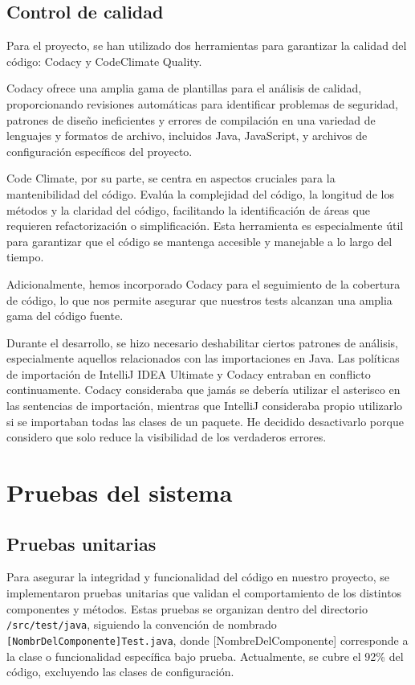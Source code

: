 \subsection{Control de calidad}
Para el proyecto, se han utilizado dos herramientas para garantizar la calidad del código: Codacy y CodeClimate Quality.

Codacy ofrece una amplia gama de plantillas para el análisis de calidad, proporcionando revisiones automáticas para identificar problemas de seguridad, patrones de diseño ineficientes y errores de compilación en una variedad de lenguajes y formatos de archivo, incluidos Java, JavaScript, y archivos de configuración específicos del proyecto. 

Code Climate, por su parte, se centra en aspectos cruciales para la mantenibilidad del código. Evalúa la complejidad del código, la longitud de los métodos y la claridad del código, facilitando la identificación de áreas que requieren refactorización o simplificación. Esta herramienta es especialmente útil para garantizar que el código se mantenga accesible y manejable a lo largo del tiempo.

Adicionalmente, hemos incorporado Codacy para el seguimiento de la cobertura de código, lo que nos permite asegurar que nuestros tests alcanzan una amplia gama del código fuente.

Durante el desarrollo, se hizo necesario deshabilitar ciertos patrones de análisis, especialmente aquellos relacionados con las importaciones en Java. Las políticas de importación de IntelliJ IDEA Ultimate y Codacy entraban en conflicto continuamente. Codacy consideraba que jamás se debería utilizar el asterisco en las sentencias de importación, mientras que IntelliJ consideraba propio utilizarlo si se importaban todas las clases de un paquete. He decidido desactivarlo porque considero que solo reduce la visibilidad de los verdaderos errores.

\section{Pruebas del sistema}
\subsection{Pruebas unitarias}
Para asegurar la integridad y funcionalidad del código en nuestro proyecto, se implementaron pruebas unitarias que validan el comportamiento de los distintos componentes y métodos. Estas pruebas se organizan dentro del directorio \verb|/src/test/java|, siguiendo la convención de nombrado \verb|[NombrDelComponente]Test.java|, donde [NombreDelComponente] corresponde a la clase o funcionalidad específica bajo prueba. Actualmente, se cubre el 92\% del código, excluyendo las clases de configuración.

